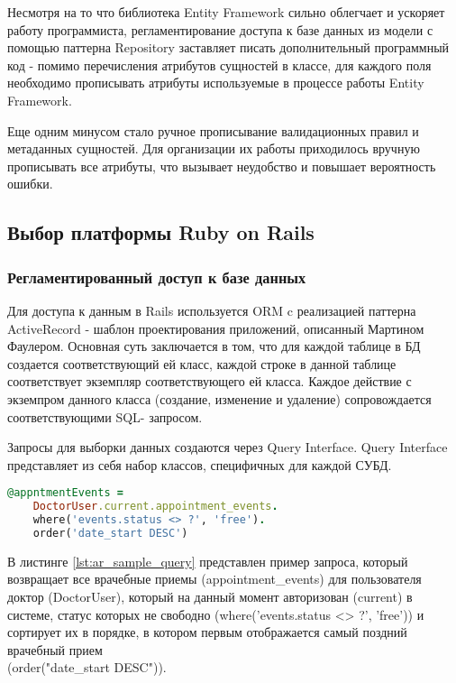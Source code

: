 Несмотря на то что библиотека Entity Framework сильно облегчает и ускоряет
работу программиста, регламентирование доступа к базе данных из модели с помощью
паттерна Repository заставляет писать дополнительный программный код - помимо
перечисления атрибутов сущностей в классе, для каждого поля  необходимо
прописывать атрибуты используемые в процессе работы Entity Framework.

Еще одним минусом стало ручное прописывание валидационных правил и метаданных сущностей. 
Для организации их работы приходилось вручную прописывать все атрибуты, что вызывает 
неудобство и повышает вероятность ошибки.

\subsection{Выбор платформы Ruby on Rails}
\subsubsection{Регламентированный доступ к базе данных}
Для доступа к данным в Rails используется ORM c реализацией паттерна
ActiveRecord - шаблон проектирования приложений, описанный Мартином Фаулером.
Основная суть заключается в том, что для каждой таблице в БД создается
соответствующий ей класс, каждой строке в данной таблице соответствует экземпляр
соответствующего ей класса. Каждое действие с экземпром данного класса
(создание, изменение и удаление) сопровождается соответствующими SQL- запросом.

Запросы для выборки данных создаются через Query Interface. Query Interface
представляет из себя набор классов, специфичных для каждой СУБД.

\begin{lstlisting}[language=Ruby,caption=Запрос через ActiveRecord,label={lst:ar_sample_query}] 
@appntmentEvents = 
	DoctorUser.current.appointment_events.
	where('events.status <> ?', 'free').
	order('date_start DESC')
\end{lstlisting}

В листинге \ref{lst:ar_sample_query} представлен пример запроса, который
возвращает все врачебные приемы (appointment\_events) для пользователя доктор (DoctorUser), 
который на данный момент авторизован (current)
в системе, статус которых не свободно (where('events.status <> ?', 'free')) и
сортирует их в порядке, в котором первым отображается самый поздний врачебный прием
\\ (order("date\_start DESC")).

